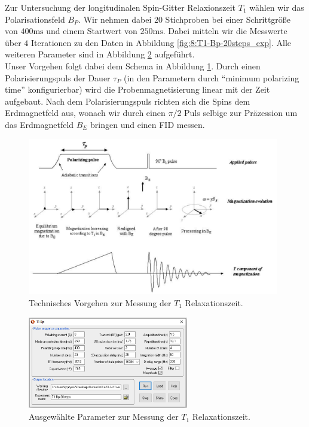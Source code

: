 \documentclass[../../main.tex]{subfiles}
\begin{document}
    Zur Untersuchung der longitudinalen Spin-Gitter Relaxionszeit $T_1$ wählen wir das Polarisationsfeld $B_P$. Wir nehmen dabei $20$ Stichproben bei einer Schrittgröße von $400\si{\ms}$ und einem Startwert von $250\si{\ms}$. Dabei mitteln wir die Messwerte über $4$ Iterationen zu den Daten in Abbildung \ref{fig:8:T1-Bp-20steps_exp}. Alle weiteren Parameter sind in Abbildung \ref{fig:8:Parameter} aufgeführt. \\

    Unser Vorgehen folgt dabei dem Schema in Abbildung \ref{fig:8:Messprozess}. Durch einen Polarisierungspuls der Dauer $\tau_P$ (in den Parametern durch \enquote{minimum polarizing time} konfigurierbar) wird die Probenmagnetisierung linear mit der Zeit aufgebaut. Nach dem Polarisierungspuls richten sich die Spins dem Erdmagnetfeld aus, wonach wir durch einen $\pi/2$ Puls selbige zur Präzession um das Erdmagnetfeld $B_E$ bringen und einen FID messen.

    \begin{figure}[H]
        \centering
        \includegraphics[width=11cm]{Bilddateien/8/Messprozess.png}
        \caption{Technisches Vorgehen zur Messung der $T_1$ Relaxationszeit.}
        \label{fig:8:Messprozess}
    \end{figure}

    \begin{figure}[H]
        \centering
        \includegraphics[width=7cm]{Bilddateien/8/Parameter.png}
        \caption{Ausgewählte Parameter zur Messung der $T_1$ Relaxationszeit.}
        \label{fig:8:Parameter}
    \end{figure}
\end{document}
